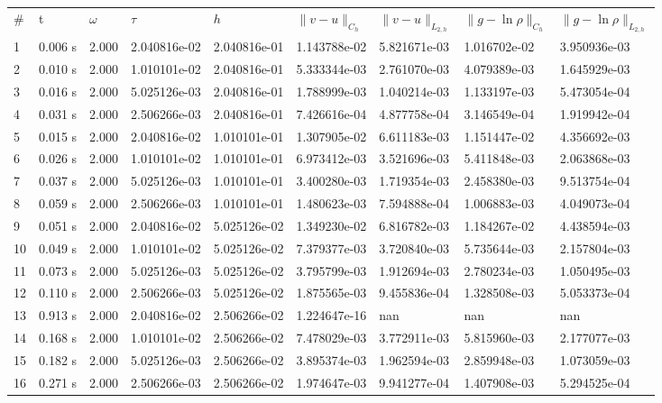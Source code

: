 \documentclass[12pt]{article}
\begin{document}
\begin{center}
\begin{tabular}{lllllllll}
\# & t & $\omega$ & $\tau$ & $h$ & $\|v - u\|_{C_h}$ & $\|v - u\|_{L_{2,h}}$ & $\|g - \ln\rho\|_{C_h}$ & $\|g - \ln\rho\|_{L_{2,h}}$ \\

1&      0.006 s&      2.000&      2.040816e-02&      2.040816e-01&      1.143788e-02&      5.821671e-03&      1.016702e-02&      3.950936e-03\\
2&      0.010 s&      2.000&      1.010101e-02&      2.040816e-01&      5.333344e-03&      2.761070e-03&      4.079389e-03&      1.645929e-03\\
3&      0.016 s&      2.000&      5.025126e-03&      2.040816e-01&      1.788999e-03&      1.040214e-03&      1.133197e-03&      5.473054e-04\\
4&      0.031 s&      2.000&      2.506266e-03&      2.040816e-01&      7.426616e-04&      4.877758e-04&      3.146549e-04&      1.919942e-04\\
5&      0.015 s&      2.000&      2.040816e-02&      1.010101e-01&      1.307905e-02&      6.611183e-03&      1.151447e-02&      4.356692e-03\\
6&      0.026 s&      2.000&      1.010101e-02&      1.010101e-01&      6.973412e-03&      3.521696e-03&      5.411848e-03&      2.063868e-03\\
7&      0.037 s&      2.000&      5.025126e-03&      1.010101e-01&      3.400280e-03&      1.719354e-03&      2.458380e-03&      9.513754e-04\\
8&      0.059 s&      2.000&      2.506266e-03&      1.010101e-01&      1.480623e-03&      7.594888e-04&      1.006883e-03&      4.049073e-04\\
9&      0.051 s&      2.000&      2.040816e-02&      5.025126e-02&      1.349230e-02&      6.816782e-03&      1.184267e-02&      4.438594e-03\\
10&      0.049 s&      2.000&      1.010101e-02&      5.025126e-02&      7.379377e-03&      3.720840e-03&      5.735644e-03&      2.157804e-03\\
11&      0.073 s&      2.000&      5.025126e-03&      5.025126e-02&      3.795799e-03&      1.912694e-03&      2.780234e-03&      1.050495e-03\\
12&      0.110 s&      2.000&      2.506266e-03&      5.025126e-02&      1.875565e-03&      9.455836e-04&      1.328508e-03&      5.053373e-04\\
13&      0.913 s&      2.000&      2.040816e-02&      2.506266e-02&      1.224647e-16&      nan&      nan&      nan\\
14&      0.168 s&      2.000&      1.010101e-02&      2.506266e-02&      7.478029e-03&      3.772911e-03&      5.815960e-03&      2.177077e-03\\
15&      0.182 s&      2.000&      5.025126e-03&      2.506266e-02&      3.895374e-03&      1.962594e-03&      2.859948e-03&      1.073059e-03\\
16&      0.271 s&      2.000&      2.506266e-03&      2.506266e-02&      1.974647e-03&      9.941277e-04&      1.407908e-03&      5.294525e-04\\

\end{tabular}
\end{center}
\end{document}
